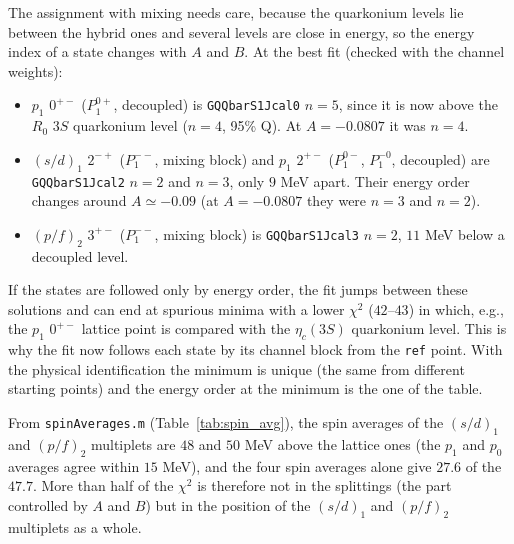 \documentclass[11pt, a4paper]{article}
\begin{document}
\begin{itemize}
    The assignment with mixing needs care, because the quarkonium levels lie between the hybrid ones and several levels are close in energy, so the energy index of a state changes with $A$ and $B$. At the best fit (checked with the channel weights):
    \begin{itemize}
        \item $p_1$ $0^{+-}$ ($P_1^{0+}$, decoupled) is \texttt{GQQbarS1Jcal0} $n=5$, since it is now above the $R_0$ $3S$ quarkonium level ($n=4$, 95\% Q). At $A=-0.0807$ it was $n=4$.
        \item $(s/d)_1$ $2^{-+}$ ($P_1^{--}$, mixing block) and $p_1$ $2^{+-}$ ($P_1^{0-}$, $P_1^{-0}$, decoupled) are \texttt{GQQbarS1Jcal2} $n=2$ and $n=3$, only $9$ MeV apart. Their energy order changes around $A\simeq-0.09$ (at $A=-0.0807$ they were $n=3$ and $n=2$).
        \item $(p/f)_2$ $3^{+-}$ ($P_1^{--}$, mixing block) is \texttt{GQQbarS1Jcal3} $n=2$, $11$ MeV below a decoupled level.
    \end{itemize}
    If the states are followed only by energy order, the fit jumps between these solutions and can end at spurious minima with a lower $\chi^2$ ($42$--$43$) in which, e.g., the $p_1$ $0^{+-}$ lattice point is compared with the $\eta_c(3S)$ quarkonium level. This is why the fit now follows each state by its channel block from the \texttt{ref} point. With the physical identification the minimum is unique (the same from different starting points) and the energy order at the minimum is the one of the table.

    From \texttt{spinAverages.m} (Table~\ref{tab:spin_avg}), the spin averages of the $(s/d)_1$ and $(p/f)_2$ multiplets are $48$ and $50$ MeV above the lattice ones (the $p_1$ and $p_0$ averages agree within $15$ MeV), and the four spin averages alone give $27.6$ of the $47.7$. More than half of the $\chi^2$ is therefore not in the splittings (the part controlled by $A$ and $B$) but in the position of the $(s/d)_1$ and $(p/f)_2$ multiplets as a whole.
\end{itemize}
\end{document}
